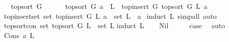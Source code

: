 \begin{isabellebody}
\ \ \ {\isachardoublequoteopen}top{\isacharunderscore}{\kern0pt}sort\ G\ {\isacharbrackleft}{\kern0pt}{\isacharbrackright}{\kern0pt}{\isacharequal}{\kern0pt}\ {\isacharbrackleft}{\kern0pt}{\isacharbrackright}{\kern0pt}\ {\isachardoublequoteclose}\isanewline
\ \ {\isacharbar}{\kern0pt}\ {\isachardoublequoteopen}top{\isacharunderscore}{\kern0pt}sort\ G\ {\isacharparenleft}{\kern0pt}a\ {\isacharhash}{\kern0pt}\ L{\isacharparenright}{\kern0pt}\ {\isacharequal}{\kern0pt}\ top{\isacharunderscore}{\kern0pt}insert\ G\ {\isacharparenleft}{\kern0pt}top{\isacharunderscore}{\kern0pt}sort\ G\ L{\isacharparenright}{\kern0pt}\ a{\isachardoublequoteclose}%
\isadelimdocument
%
\endisadelimdocument
%
\isatagdocument
%
\isamarkuptrue%
%
\endisatagdocument
{\isafolddocument}%
%
\isadelimdocument
%
\endisadelimdocument
{}\isamarkupfalse%
\ top{\isacharunderscore}{\kern0pt}insert{\isacharunderscore}{\kern0pt}set{\isacharcolon}{\kern0pt}\ {\isachardoublequoteopen}set\ {\isacharparenleft}{\kern0pt}top{\isacharunderscore}{\kern0pt}insert\ G\ L\ a{\isacharparenright}{\kern0pt}\ {\isacharequal}{\kern0pt}\ set\ L\ {\isasymunion}\ {\isacharbraceleft}{\kern0pt}a{\isacharbraceright}{\kern0pt}{\isachardoublequoteclose}\ \isanewline
%
\isadelimproof
%
\endisadelimproof
%
\isatagproof
{}\isamarkupfalse%
{\isacharparenleft}{\kern0pt}induct\ L{\isacharcomma}{\kern0pt}\ simp{\isacharunderscore}{\kern0pt}all{\isacharcomma}{\kern0pt}\ auto{\isacharparenright}{\kern0pt}\ \isamarkupfalse%
%
\endisatagproof
{\isafoldproof}%
%
\isadelimproof
\ \isanewline
%
\endisadelimproof
\isanewline
{}\isamarkupfalse%
\ top{\isacharunderscore}{\kern0pt}sort{\isacharunderscore}{\kern0pt}con{\isacharcolon}{\kern0pt}\ {\isachardoublequoteopen}set\ {\isacharparenleft}{\kern0pt}top{\isacharunderscore}{\kern0pt}sort\ G\ L{\isacharparenright}{\kern0pt}\ {\isacharequal}{\kern0pt}\ set\ L{\isachardoublequoteclose}\isanewline
%
\isadelimproof
%
\endisadelimproof
%
\isatagproof
{}\isamarkupfalse%
{\isacharparenleft}{\kern0pt}induct\ L{\isacharparenright}{\kern0pt}\isanewline
\ \ \isamarkupfalse%
\ Nil\isanewline
\ \ \isamarkupfalse%
\ \isamarkupfalse%
\ {\isacharquery}{\kern0pt}case\ \isamarkupfalse%
\ auto\isanewline
{}\isamarkupfalse%
\isanewline
\ \ \isamarkupfalse%
\ {\isacharparenleft}{\kern0pt}Cons\ a\ L{\isacharparenright}{\kern0pt}\isanewline
\ \ \isamarkupfalse%

\end{isabellebody}
